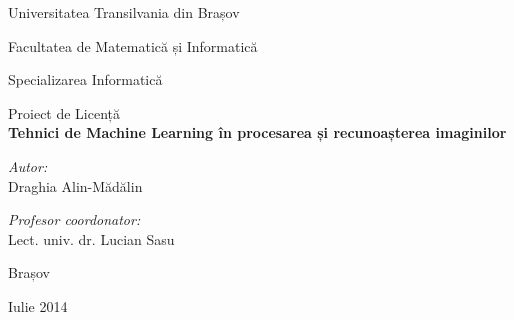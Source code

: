 \pagestyle{empty}

\begin{titlepage}

\begin{center}

\Large Universitatea Transilvania din Brașov

\Large Facultatea de Matematică și Informatică

\large Specializarea Informatică

\vfill
\Large Proiect de Licență\\[0.3cm]
 
{ \Huge \bfseries Tehnici de Machine Learning în procesarea și recunoașterea imaginilor}\\[2cm]
 
\begin{minipage}{0.4\textwidth}
\begin{flushleft} \large
\emph{Autor:}\\
Draghia Alin-Mădălin
\end{flushleft}
\end{minipage}
\begin{minipage}{0.5\textwidth}
\begin{flushright} \large
\emph{Profesor coordonator:} \\
Lect. univ. dr. Lucian Sasu
\end{flushright}
\end{minipage}
 
\vfill

{\Large Brașov}

{\large Iulie 2014}
 
\end{center}
 
\end{titlepage}
\pagestyle{fancy}